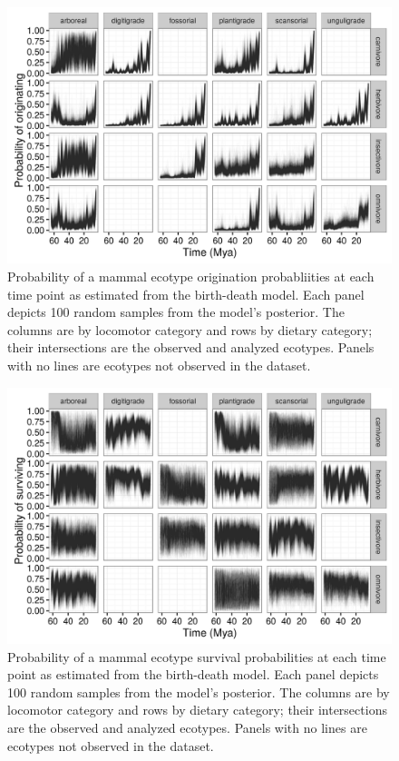 \documentclass[12pt,letterpaper]{article}
\begin{document}
\begin{figure}[ht]
  \centering
  \includegraphics[width=\textwidth,height=0.4\textheight,keepaspectratio=true]{figure/ecotype_origin_bd}
  \caption[Ecotype origination probability estimated from the birth-death model]{Probability of a mammal ecotype origination probabliities at each time point as estimated from the birth-death model. Each panel depicts 100 random samples from the model's posterior. The columns are by locomotor category and rows by dietary category; their intersections are the observed and analyzed ecotypes. Panels with no lines are ecotypes not observed in the dataset.}
  \label{fig:eco_origin}
\end{figure}

\begin{figure}[ht]
  \centering
  \includegraphics[width=\textwidth,height=0.4\textheight,keepaspectratio=true]{figure/ecotype_survival_bd}
  \caption[Ecotype survival probability estimated from the birth-death model]{Probability of a mammal ecotype survival probabilities at each time point as estimated from the birth-death model. Each panel depicts 100 random samples from the model's posterior. The columns are by locomotor category and rows by dietary category; their intersections are the observed and analyzed ecotypes. Panels with no lines are ecotypes not observed in the dataset.}
  \label{fig:eco_survival}
\end{figure}
\end{document}

